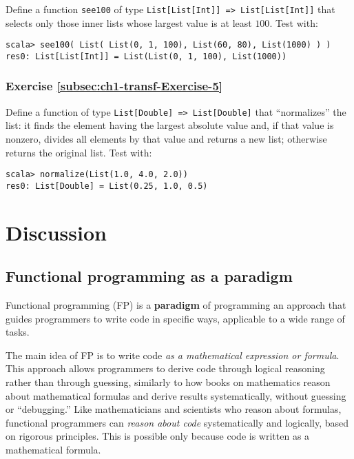 Define a function \lstinline!see100! of type \texttt{}\lstinline!List[List[Int]] => List[List[Int]]!
that selects only those inner lists whose largest value is at least
$100$. Test with:
\begin{lstlisting}
scala> see100( List( List(0, 1, 100), List(60, 80), List(1000) ) )
res0: List[List[Int]] = List(List(0, 1, 100), List(1000))
\end{lstlisting}


\subsubsection{Exercise \label{subsec:ch1-transf-Exercise-5}\ref{subsec:ch1-transf-Exercise-5}}

Define a function of type \texttt{}\lstinline!List[Double] => List[Double]!
that \textsf{``}normalizes\textsf{''} the list: it finds the element having the largest
absolute value and, if that value is nonzero, divides all elements
by that value and returns a new list; otherwise returns the original
list. Test with:
\begin{lstlisting}
scala> normalize(List(1.0, 4.0, 2.0))
res0: List[Double] = List(0.25, 1.0, 0.5)
\end{lstlisting}


\section{Discussion}

\subsection{Functional programming as a paradigm}

Functional programming (FP)
is a \textbf{paradigm} of programming
\textemdash{} an approach that guides programmers to write code in
specific ways, applicable to a wide range of tasks.

The main idea of FP is to write code \emph{as a mathematical expression
or formula}. This approach allows programmers to derive code through
logical reasoning rather than through guessing, similarly to how books
on mathematics reason about mathematical formulas and derive results
systematically, without guessing or \textsf{``}debugging.\textsf{''} Like mathematicians
and scientists who reason about formulas, functional programmers can
\emph{reason about code} systematically and logically, based on rigorous
principles. This is possible only because code is written as a mathematical
formula.

